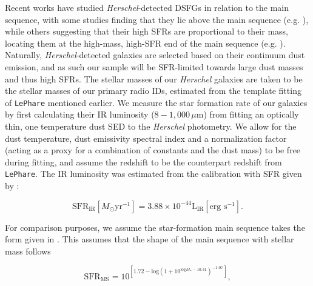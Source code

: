 Recent works have studied \textit{Herschel}-detected DSFGs in relation to the main sequence, with some studies finding that they lie above the main sequence (e.g. \citealt{Hainline_2011}), while others suggesting that their high SFRs are proportional to their mass, locating them at the high-mass, high-SFR end of the main sequence (e.g. \citealt{Michalowski_2012a}). Naturally, \textit{Herschel}-detected galaxies are selected based on their continuum dust emission, and as such our sample will be SFR-limited towards large dust masses and thus high SFRs. The stellar masses of our \textit{Herschel} galaxies are taken to be the stellar masses of our primary radio IDs, estimated from the template fitting of \texttt{LePhare} mentioned earlier. We measure the star formation rate of our galaxies by first calculating their IR luminosity ($8 - 1,000\,\mu$m) from fitting an optically thin, one temperature dust SED to the \textit{Herschel} photometry. We allow for the dust temperature, dust emissivity spectral index and a normalization factor (acting as a proxy for a combination of constants and the dust mass) to be free during fitting, and assume the redshift to be the counterpart redshift from \texttt{LePhare}. The IR luminosity was estimated from the calibration with SFR given by \citealt{Murphy_2011}:

\begin{equation}
	\textrm{SFR}_{\textrm{IR}} [M_\odot\textrm{yr}^{-1}] = 3.88\times10^{-44}\textrm{L}_{\textrm{IR}} [\textrm{erg s}^{-1}].
	\label{eq:LIR_SFR_calibration}
\end{equation}

For comparison purposes, we assume the star-formation main sequence takes the form given in \citealt{Scoville_2017}. This assumes that the shape of the main sequence with stellar mass follows 

\begin{equation}
	\textrm{SFR}_{\textrm{MS}} = 10^{[1.72-\textrm{log}(1+10^{\textrm{log}M_*-10.31})^{-1.07}]},
	\label{eq:scoville_ms}
\end{equation}


